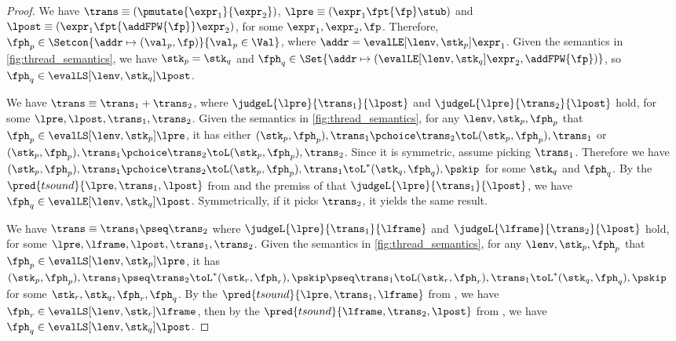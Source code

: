 \begin{proof}

We have \( \trans \equiv (\pmutate{\expr_{1}}{\expr_{2}}) \), \( \lpre \equiv ( \expr_{1} \fpt{\fp} \stub ) \) and \( \lpost \equiv ( \expr_{1} \fpt{\addFPW{\fp}} \expr_{2} ) \), for some \( \expr_{1}, \expr_{2}, \fp \).
Therefore, \( \fph_{p} \in \Setcon{ \addr \mapsto (\val_{p} , \fp) }{ \val_{p} \in \Val } \), where \( \addr = \evalLE[\lenv, \stk_{p}]{\expr_{1}} \).
Given the semantics in \fig \ref{fig:thread_semantics}, we have \( \stk_{p} = \stk_{q} \) and \( \fph_{q} \in \Set{\addr \mapsto ( \evalLE[\lenv, \stk_{q}]{\expr_{2}},  \addFPW{\fp} ) } \), so \( \fph_{q} \in \evalLS[\lenv, \stk_{q}]{\lpost} \).


We have  \(\trans \equiv \trans_{1} + \trans_{2} \), where \( \judgeL{\lpre}{\trans_{1}}{\lpost} \) and \( \judgeL{\lpre}{\trans_{2}}{\lpost} \) hold, for some \( \lpre, \lpost, \trans_{1}, \trans_{2} \).
Given the semantics in \fig \ref{fig:thread_semantics}, for any \( \lenv, \stk_{p}, \fph_{p} \) that \( \fph_{p} \in \evalLS[\lenv, \stk_{p}]{\lpre} \), it has either \( ( \stk_{p}, \fph_{p} ), \trans_{1} \pchoice \trans_{2} \toL ( \stk_{p}, \fph_{p} ), \trans_{1} \) or  \( ( \stk_{p}, \fph_{p} ), \trans_{1} \pchoice \trans_{2} \toL ( \stk_{p}, \fph_{p} ), \trans_{2} \).
Since it is symmetric, assume picking \( \trans_{1} \).
Therefore we have \( ( \stk_{p}, \fph_{p} ), \trans_{1} \pchoice \trans_{2} \toL ( \stk_{p}, \fph_{p} ), \trans_{1} \toL^{*} ( \stk_{q}, \fph_{q} ), \pskip \) for some \( \stk_{q} \) and \( \fph_{q} \).
By the \( \pred{tsound}{\lpre, \trans_{1}, \lpost} \) from \ih and the premiss of  that \( \judgeL{\lpre}{\trans_{1}}{\lpost} \), we have \( \fph_{q} \in \evalLE[\lenv, \stk_{q}]{\lpost} \).
Symmetrically, if it picks \( \trans_{2} \), it yields the same result.


We have \( \trans \equiv \trans_{1} \pseq \trans_{2} \) where \( \judgeL{\lpre}{\trans_{1}}{\lframe} \) and \( \judgeL{\lframe}{\trans_{2}}{\lpost} \) hold, for some \( \lpre, \lframe, \lpost, \trans_{1}, \trans_{2} \).
Given the semantics in \fig \ref{fig:thread_semantics}, for any \( \lenv, \stk_{p}, \fph_{p} \) that \( \fph_{p} \in \evalLS[\lenv, \stk_{p}]{\lpre} \), it has \( ( \stk_{p}, \fph_{p} ), \trans_{1} \pseq \trans_{2} \toL^{*} ( \stk_{r}, \fph_{r} ), \pskip \pseq \trans_{1} \toL ( \stk_{r}, \fph_{r} ), \trans_{1} \toL^{*} ( \stk_{q}, \fph_{q} ), \pskip \) for some \( \stk_{r}, \stk_{q}, \fph_{r}, \fph_{q} \).
By the \( \pred{tsound}{\lpre, \trans_{1}, \lframe} \) from \ih, we have \( \fph_{r} \in \evalLS[\lenv, \stk_{r}]{\lframe} \), then by the \( \pred{tsound}{\lframe, \trans_{2}, \lpost} \) from \ih, we have \( \fph_{q} \in \evalLS[\lenv, \stk_{q}]{\lpost} \).


\end{proof}
